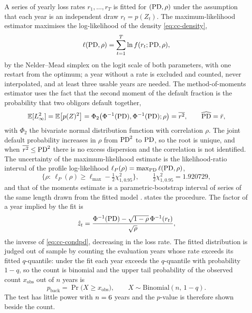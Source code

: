 A series of yearly loss rates $r_1,\dots,r_T$ is fitted for $(\mathrm{PD},\rho)$ under the assumption that each year is an independent draw
$r_t=p(Z_t)$. The maximum-likelihood estimator maximises the log-likelihood of the density \cref{eq:cc-density},
\begin{equation}
\ell(\mathrm{PD},\rho)=\sum_{t=1}^{T}\ln f(r_t;\mathrm{PD},\rho),
\label{eq:cc-loglik}
\end{equation}
by the Nelder--Mead simplex on the logit scale of both parameters, with one restart from the optimum; a year without a rate is
excluded and counted, never interpolated, and at least three usable years are needed. The method-of-moments estimator uses the fact that
the second moment of the default fraction is the probability that two obligors default together,
\begin{equation}
\mathbb{E}[L_\infty^2]=\mathbb{E}\big[p(Z)^2\big]=\Phi_2\big(\Phi^{-1}(\mathrm{PD}),\Phi^{-1}(\mathrm{PD});\rho\big)=\overline{r^2},\qquad \widehat{\mathrm{PD}}=\bar r,
\label{eq:cc-moments}
\end{equation}
with $\Phi_2$ the bivariate normal distribution function with correlation $\rho$. The joint default probability increases in $\rho$ from
$\mathrm{PD}^2$ to $\mathrm{PD}$, so the root is unique, and when $\overline{r^2}\le\mathrm{PD}^2$ there is no excess dispersion and the correlation is not
identified. The uncertainty of the maximum-likelihood estimate is the likelihood-ratio interval of the profile log-likelihood
$\ell_P(\rho)=\max_{\mathrm{PD}}\ell(\mathrm{PD},\rho)$,
\begin{equation}
\Big\{\rho:\ \ell_P(\rho)\ge\ell_{\max}-\tfrac12\chi^2_{1,0.95}\Big\},\qquad \tfrac12\chi^2_{1,0.95}=1.920729,
\label{eq:cc-profile}
\end{equation}
and that of the moments estimate is a parametric-bootstrap interval of \ccBoot{} series of the same length drawn from the fitted model
\citep{ratings:vasicek2002}.  states the procedure. The factor of a year implied by the fit is
\begin{equation}
\hat z_t=\frac{\Phi^{-1}(\mathrm{PD})-\sqrt{1-\rho}\,\Phi^{-1}(r_t)}{\sqrt{\rho}},
\label{eq:cc-implied}
\end{equation}
the inverse of \cref{eq:cc-condpd}, decreasing in the loss rate. The fitted distribution is judged out of sample by counting the
evaluation years whose rate exceeds its fitted $q$-quantile: under the fit each year exceeds the $q$-quantile with probability $1-q$, so
the count is binomial and the upper tail probability of the observed count $x_{\mathrm{obs}}$ out of $n$ years is
\begin{equation}
p_{\mathrm{back}}=\Pr\big(X\ge x_{\mathrm{obs}}\big),\qquad X\sim\mathrm{Binomial}(n,\,1-q).
\label{eq:cc-backtest}
\end{equation}
The test has little power with $n=6$ years and the $p$-value is therefore shown beside the count.

